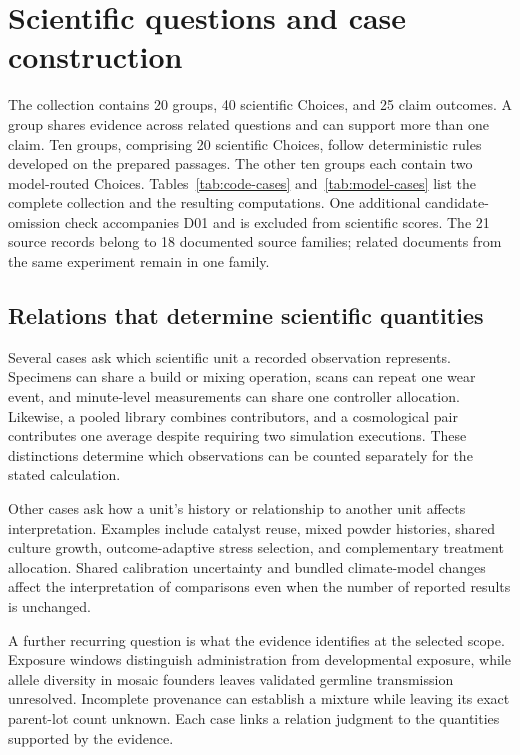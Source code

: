 \section{Scientific questions and case construction}
\label{app:cases}

The collection contains 20 groups, 40 scientific Choices, and 25 claim outcomes.
A group shares evidence across related questions and can support more than one claim.
Ten groups, comprising 20 scientific Choices, follow deterministic rules developed on the prepared passages.
The other ten groups each contain two model-routed Choices.
Tables~\ref{tab:code-cases} and~\ref{tab:model-cases} list the complete collection and the resulting computations.
One additional candidate-omission check accompanies D01 and is excluded from scientific scores.
The 21 source records belong to 18 documented source families; related documents from the same experiment remain in one family.

\subsection{Relations that determine scientific quantities}

Several cases ask which scientific unit a recorded observation represents.
Specimens can share a build or mixing operation, scans can repeat one wear event, and minute-level measurements can share one controller allocation.
Likewise, a pooled library combines contributors, and a cosmological pair contributes one average despite requiring two simulation executions.
These distinctions determine which observations can be counted separately for the stated calculation.

Other cases ask how a unit's history or relationship to another unit affects interpretation.
Examples include catalyst reuse, mixed powder histories, shared culture growth, outcome-adaptive stress selection, and complementary treatment allocation.
Shared calibration uncertainty and bundled climate-model changes affect the interpretation of comparisons even when the number of reported results is unchanged.

A further recurring question is what the evidence identifies at the selected scope.
Exposure windows distinguish administration from developmental exposure, while allele diversity in mosaic founders leaves validated germline transmission unresolved.
Incomplete provenance can establish a mixture while leaving its exact parent-lot count unknown.
Each case links a relation judgment to the quantities supported by the evidence.

